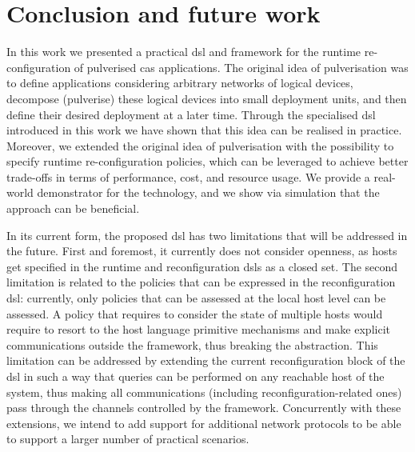 \documentclass[conference]{IEEEtran}
\begin{document}
\section{Conclusion and future work}\label{sec:conclusion}

In this work we presented a practical \ac{dsl} and framework for the
runtime re-configuration of pulverised \ac{cas} applications.
%
The original idea of pulverisation was to define applications considering arbitrary networks of logical devices,
decompose (pulverise) these logical devices into small deployment units,
and then define their desired deployment at a later time.
%
Through the specialised \ac{dsl} introduced in this work
we have shown that this idea can be realised in practice.
%
Moreover, we extended the original idea of pulverisation with the possibility to specify runtime re-configuration policies,
which can be leveraged to achieve better trade-offs in terms of performance, cost, and resource usage.
%
We provide a real-world demonstrator for the technology,
and we show via simulation that the approach can be beneficial.

In its current form, the proposed \ac{dsl} has two limitations that will be addressed in the future.
%
First and foremost, it currently does not consider openness,
as hosts get specified in the runtime and reconfiguration \acp{dsl} as a closed set.
%
The second limitation is related to the policies that can be expressed in the reconfiguration \ac{dsl}:
currently, only policies that can be assessed at the local host level can be assessed.
%
A policy that requires to consider the state of multiple hosts would require to resort to the host language primitive mechanisms and make explicit communications outside the framework,
thus breaking the abstraction.
%
This limitation can be addressed by extending the current reconfiguration
block of the \ac{dsl} in such a way that queries can be performed on any reachable host of the system,
thus making all communications
(including reconfiguration-related ones)
pass through the channels controlled by the framework.
%
Concurrently with these extensions,
we intend to add support for additional network protocols to be able to support a larger number of practical scenarios.




\end{document}
